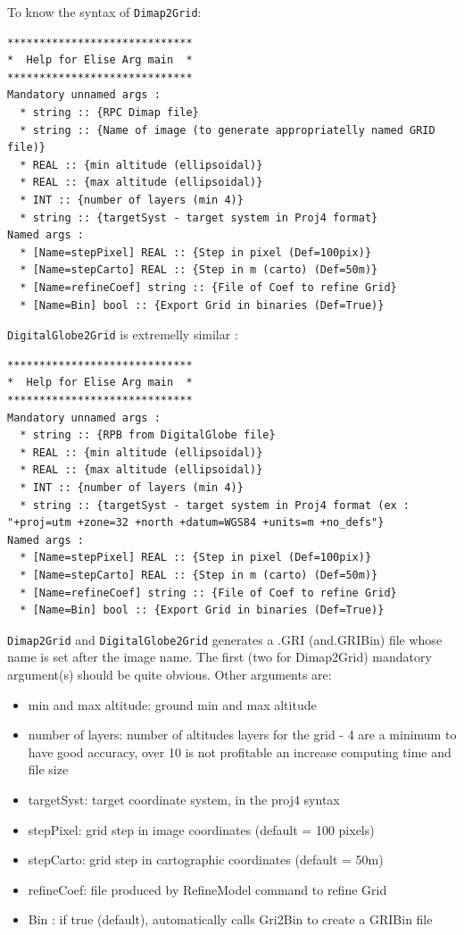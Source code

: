 To know the syntax of {\tt Dimap2Grid}:
\begin{verbatim}
*****************************
*  Help for Elise Arg main  *
*****************************
Mandatory unnamed args :
  * string :: {RPC Dimap file}
  * string :: {Name of image (to generate appropriatelly named GRID file)}
  * REAL :: {min altitude (ellipsoidal)}
  * REAL :: {max altitude (ellipsoidal)}
  * INT :: {number of layers (min 4)}
  * string :: {targetSyst - target system in Proj4 format}
Named args :
  * [Name=stepPixel] REAL :: {Step in pixel (Def=100pix)}
  * [Name=stepCarto] REAL :: {Step in m (carto) (Def=50m)}
  * [Name=refineCoef] string :: {File of Coef to refine Grid}
  * [Name=Bin] bool :: {Export Grid in binaries (Def=True)}

\end{verbatim}


{\tt DigitalGlobe2Grid} is extremelly similar :
\begin{verbatim}
*****************************
*  Help for Elise Arg main  *
*****************************
Mandatory unnamed args :
  * string :: {RPB from DigitalGlobe file}
  * REAL :: {min altitude (ellipsoidal)}
  * REAL :: {max altitude (ellipsoidal)}
  * INT :: {number of layers (min 4)}
  * string :: {targetSyst - target system in Proj4 format (ex : "+proj=utm +zone=32 +north +datum=WGS84 +units=m +no_defs"}
Named args :
  * [Name=stepPixel] REAL :: {Step in pixel (Def=100pix)}
  * [Name=stepCarto] REAL :: {Step in m (carto) (Def=50m)}
  * [Name=refineCoef] string :: {File of Coef to refine Grid}
  * [Name=Bin] bool :: {Export Grid in binaries (Def=True)}
 \end{verbatim}
 
{\tt Dimap2Grid} and {\tt DigitalGlobe2Grid} generates a .GRI (and.GRIBin) file whose name is set after the image name.
The first (two for Dimap2Grid) mandatory argument(s) should be quite obvious. Other arguments are:
\begin{itemize}
\item min and max altitude: ground min and max altitude
\item number of layers: number of altitudes layers for the grid - 4 are a minimum to have good accuracy, over 10 is not profitable an increase computing time and file size
\item targetSyst: target coordinate system, in the proj4 syntax
\item stepPixel: grid step in image coordinates (default = 100 pixels)
\item stepCarto: grid step in cartographic coordinates (default = 50m)
\item refineCoef: file produced by RefineModel command to refine Grid
\item Bin : if true (default), automatically calls Gri2Bin to create a GRIBin file
\end{itemize}


